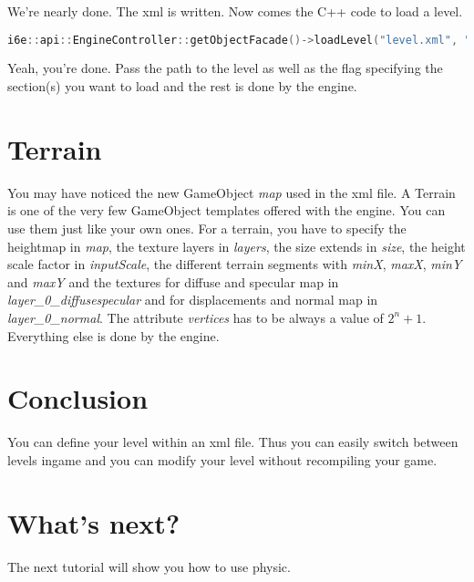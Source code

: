 \documentclass{article}
\begin{document}
We're nearly done. The xml is written. Now comes the C++ code to load a level.

\begin{lstlisting}[language=C++, style=basic, caption={loading a level}, label=code:load]
i6e::api::EngineController::getObjectFacade()->loadLevel("level.xml", "A");
\end{lstlisting}

Yeah, you're done. Pass the path to the level as well as the flag specifying the section(s) you want to load and the rest is done by the engine.

\section{Terrain}

You may have noticed the new GameObject \textit{map} used in the xml file. A Terrain is one of the very few GameObject templates offered with the engine. You can use them just like your own ones. For a terrain, you have to specify the heightmap in \textit{map}, the texture layers in \textit{layers}, the size extends in \textit{size}, the height scale factor in \textit{inputScale}, the different terrain segments with \textit{minX}, \textit{maxX}, \textit{minY} and \textit{maxY} and the textures for diffuse and specular map in \textit{layer\_{}0\_{}diffusespecular} and for displacements and normal map in \textit{layer\_{}0\_{}normal}. The attribute \textit{vertices} has to be always a value of $2^n + 1$. Everything else is done by the engine.

\section{Conclusion}

You can define your level within an xml file. Thus you can easily switch between levels ingame and you can modify your level without recompiling your game.

\section{What's next?}

The next tutorial will show you how to use physic.
\end{document}
